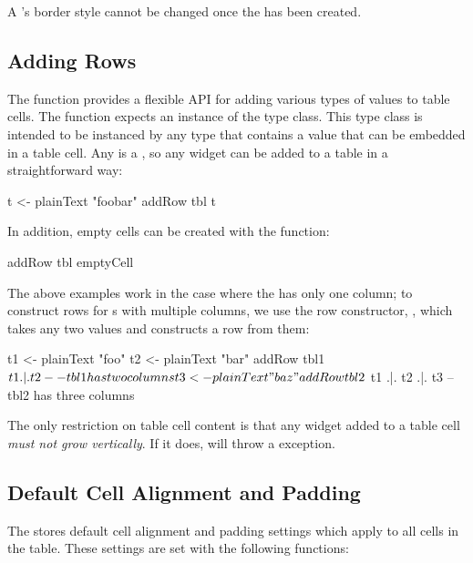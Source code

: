 A 's border style cannot be changed once the  has
been created.

\subsection{Adding Rows}

The  function provides a flexible API for adding various
types of values to table cells.  The function expects an instance of
the  type class.  This type class is intended to be
instanced by any type that contains a value that can be embedded in a
table cell.  Any  is a , so any widget can be
added to a table in a straightforward way:

\begin{haskellcode}
 t <- plainText "foobar"
 addRow tbl t
\end{haskellcode}

In addition, empty cells can be created with the 
function:

\begin{haskellcode}
 addRow tbl emptyCell
\end{haskellcode}

The above examples work in the case where the  has only one
column; to construct rows for s with multiple columns, we
use the row constructor, , which takes any two 
values and constructs a row from them:

\begin{haskellcode}
 t1 <- plainText "foo"
 t2 <- plainText "bar"
 addRow tbl1 $ t1 .|. t2 -- tbl1 has two columns

 t3 <- plainText "baz"
 addRow tbl2 $ t1 .|. t2 .|. t3 -- tbl2 has three columns
\end{haskellcode}

The only restriction on table cell content is that any widget added to
a table cell \textit{must not grow vertically}.  If it does,
 will throw a  exception.

\subsection{Default Cell Alignment and Padding}

The  stores default cell alignment and padding settings
which apply to all cells in the table.  These settings are set with
the following functions:

